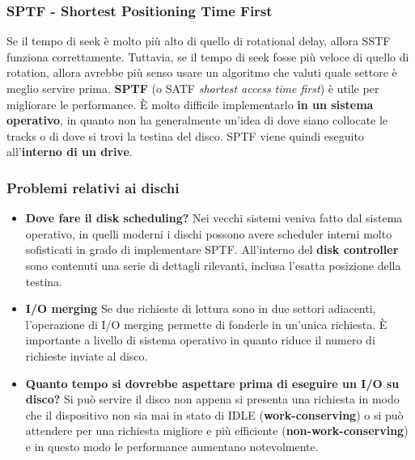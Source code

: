 \documentclass[12pt, letterpaper]{article}
\begin{document}
			\subsubsection{SPTF - Shortest Positioning Time First}
				Se il tempo di seek è molto più alto di quello di rotational delay, allora SSTF funziona correttamente. Tuttavia, se il tempo di seek fosse più veloce di quello di rotation, allora avrebbe più senso usare un algoritmo che valuti quale settore è meglio servire prima. \textbf{SPTF} (o SATF \textit{shortest access time first}) è utile per migliorare le performance. È molto difficile implementarlo \textbf{in un sistema operativo}, in quanto non ha generalmente un'idea di dove siano collocate le tracks o di dove si trovi la testina del disco. SPTF viene quindi eseguito all'\textbf{interno di un drive}.
				
			\subsubsection{Problemi relativi ai dischi}
				\begin{itemize}
					\item \textbf{Dove fare il disk scheduling?} Nei vecchi sistemi veniva fatto dal sistema operativo, in quelli moderni i dischi possono avere scheduler interni molto sofisticati in grado di implementare SPTF. All'interno del \textbf{disk controller} sono contenuti una serie di dettagli rilevanti, inclusa l'esatta posizione della testina.
					\item \textbf{I/O merging} Se due richieste di lettura sono in due settori adiacenti, l'operazione di I/O merging permette di fonderle in un'unica richiesta. È importante a livello di sistema operativo in quanto riduce il numero di richieste inviate al disco.
					\item \textbf{Quanto tempo si dovrebbe aspettare prima di eseguire un I/O su disco?} Si può servire il disco non appena si presenta una richiesta in modo che il dispositivo non sia mai in stato di IDLE (\textbf{work-conserving}) o si può attendere per una richiesta migliore e più efficiente (\textbf{non-work-conserving}) e in questo modo le performance aumentano notevolmente. 
				\end{itemize}
		
\end{document}

